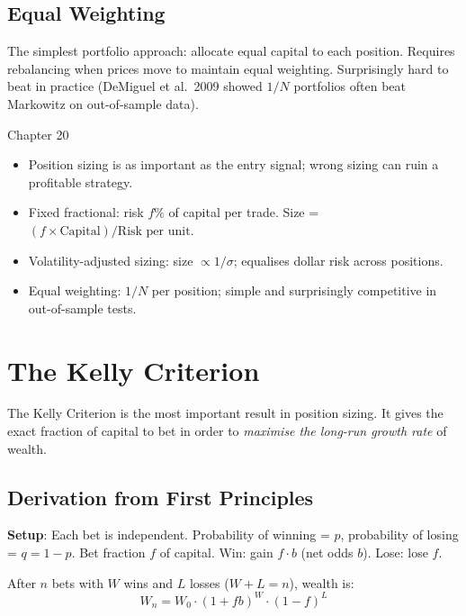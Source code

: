 \documentclass[12pt,a4paper,openany]{report}
\theoremstyle{definition}
\begin{document}
\section{Equal Weighting}

The simplest portfolio approach: allocate equal capital to each position. Requires rebalancing when prices move to maintain equal weighting. Surprisingly hard to beat in practice (DeMiguel et al.\ 2009 showed $1/N$ portfolios often beat Markowitz on out-of-sample data).

\begin{takeawaybox}{Chapter 20}
\begin{itemize}
  \item Position sizing is as important as the entry signal; wrong sizing can ruin a profitable strategy.
  \item Fixed fractional: risk $f\%$ of capital per trade. Size = $(f \times \text{Capital})/\text{Risk per unit}$.
  \item Volatility-adjusted sizing: size $\propto 1/\sigma$; equalises dollar risk across positions.
  \item Equal weighting: $1/N$ per position; simple and surprisingly competitive in out-of-sample tests.
\end{itemize}
\end{takeawaybox}

\chapter{The Kelly Criterion}

The Kelly Criterion is the most important result in position sizing. It gives the exact fraction of capital to bet in order to \emph{maximise the long-run growth rate} of wealth.

\section{Derivation from First Principles}

\textbf{Setup}: Each bet is independent. Probability of winning = $p$, probability of losing = $q = 1-p$. Bet fraction $f$ of capital. Win: gain $f \cdot b$ (net odds $b$). Lose: lose $f$.

After $n$ bets with $W$ wins and $L$ losses ($W + L = n$), wealth is:
\begin{equation}
  W_n = W_0 \cdot (1 + fb)^W \cdot (1 - f)^L
\end{equation}
\end{document}
